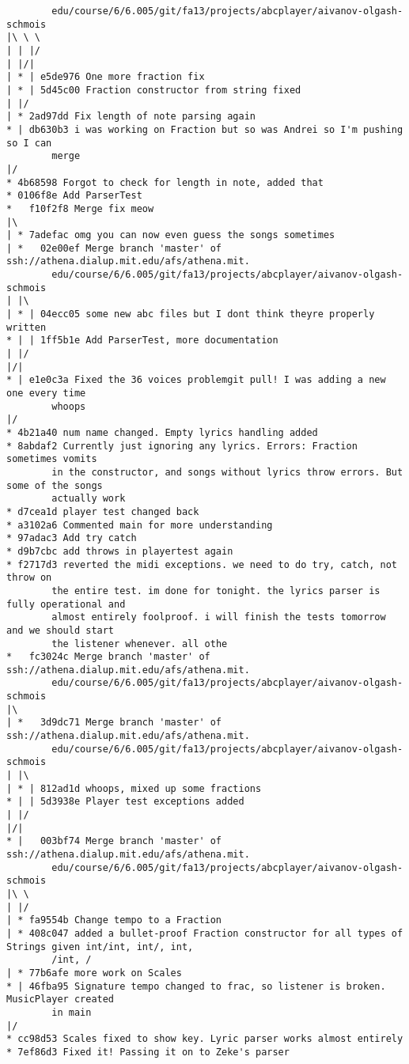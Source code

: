 \documentclass[12pt]{book}
\begin{document}
\begin{Verbatim}
        edu/course/6/6.005/git/fa13/projects/abcplayer/aivanov-olgash-schmois
|\ \ \
| | |/
| |/|
| * | e5de976 One more fraction fix
| * | 5d45c00 Fraction constructor from string fixed
| |/
| * 2ad97dd Fix length of note parsing again
* | db630b3 i was working on Fraction but so was Andrei so I'm pushing so I can 
        merge
|/
* 4b68598 Forgot to check for length in note, added that
* 0106f8e Add ParserTest
*   f10f2f8 Merge fix meow
|\
| * 7adefac omg you can now even guess the songs sometimes
| *   02e00ef Merge branch 'master' of ssh://athena.dialup.mit.edu/afs/athena.mit.
        edu/course/6/6.005/git/fa13/projects/abcplayer/aivanov-olgash-schmois
| |\
| * | 04ecc05 some new abc files but I dont think theyre properly written
* | | 1ff5b1e Add ParserTest, more documentation
| |/
|/|
* | e1e0c3a Fixed the 36 voices problemgit pull! I was adding a new one every time 
        whoops
|/
* 4b21a40 num name changed. Empty lyrics handling added
* 8abdaf2 Currently just ignoring any lyrics. Errors: Fraction sometimes vomits 
        in the constructor, and songs without lyrics throw errors. But some of the songs 
        actually work
* d7cea1d player test changed back
* a3102a6 Commented main for more understanding
* 97adac3 Add try catch
* d9b7cbc add throws in playertest again
* f2717d3 reverted the midi exceptions. we need to do try, catch, not throw on 
        the entire test. im done for tonight. the lyrics parser is fully operational and 
        almost entirely foolproof. i will finish the tests tomorrow and we should start 
        the listener whenever. all othe
*   fc3024c Merge branch 'master' of ssh://athena.dialup.mit.edu/afs/athena.mit.
        edu/course/6/6.005/git/fa13/projects/abcplayer/aivanov-olgash-schmois
|\
| *   3d9dc71 Merge branch 'master' of ssh://athena.dialup.mit.edu/afs/athena.mit.
        edu/course/6/6.005/git/fa13/projects/abcplayer/aivanov-olgash-schmois
| |\
| * | 812ad1d whoops, mixed up some fractions
* | | 5d3938e Player test exceptions added
| |/
|/|
* |   003bf74 Merge branch 'master' of ssh://athena.dialup.mit.edu/afs/athena.mit.
        edu/course/6/6.005/git/fa13/projects/abcplayer/aivanov-olgash-schmois
|\ \
| |/
| * fa9554b Change tempo to a Fraction
| * 408c047 added a bullet-proof Fraction constructor for all types of Strings given int/int, int/, int, 
        /int, /
| * 77b6afe more work on Scales
* | 46fba95 Signature tempo changed to frac, so listener is broken. MusicPlayer created 
        in main
|/
* cc98d53 Scales fixed to show key. Lyric parser works almost entirely
* 7ef86d3 Fixed it! Passing it on to Zeke's parser

\end{Verbatim}
\end{document}
